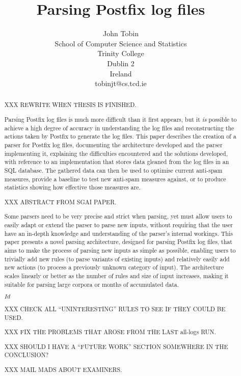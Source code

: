\documentclass[a4paper,12pt,draft]{report}
\begin{document}
\title{Parsing Postfix log files}
\author{John Tobin \\ School of Computer Science and Statistics \\
Trinity College \\ Dublin 2 \\ Ireland \\ tobinjt@cs.tcd.ie}
\maketitle

\begin{abstract}

    \setcounter{page}{2}

    XXX REWRITE WHEN THESIS IS FINISHED\@.

    Parsing Postfix log files is much more difficult than it first appears,
    but it \textit{is\/} possible to achieve a high degree of accuracy in
    understanding the log files and reconstructing the actions taken by
    Postfix to generate the log files.  This paper describes the creation
    of a parser for Postfix log files, documenting the architecture
    developed and the parser implementing it, explaining the difficulties
    encountered and the solutions developed, with reference to an
    implementation that stores data gleaned from the log files in an SQL
    database.  The gathered data can then be used to optimise current
    anti-spam measures, provide a baseline to test new anti-spam measures
    against, or to produce statistics showing how effective those measures
    are.

    XXX ABSTRACT FROM SGAI PAPER\@.

    Some parsers need to be very precise and strict when parsing, yet must
    allow users to easily adapt or extend the parser to parse new inputs,
    without requiring that the user have an in-depth knowledge and
    understanding of the parser's internal workings.  This paper presents a
    novel parsing architecture, designed for parsing Postfix log files,
    that aims to make the process of parsing new inputs as simple as
    possible, enabling users to trivially add new rules (to parse variants
    of existing inputs) and relatively easily add new actions (to process a
    previously unknown category of input).  The architecture scales
    linearly or better as the number of rules and size of input increases,
    making it suitable for parsing large corpora or months of accumulated
    data.

    \SVN$Id$
    \begin{center}
        \SVNId{}
    \end{center}

    XXX CHECK ALL ``UNINTERESTING'' RULES TO SEE IF THEY COULD BE USED\@.

    XXX FIX THE PROBLEMS THAT AROSE FROM THE LAST all-logs RUN\@.

    XXX SHOULD I HAVE A ``FUTURE WORK'' SECTION SOMEWHERE IN THE
    CONCLUSION\@?

    XXX MAIL MADS ABOUT EXAMINERS\@.

\end{abstract}
\end{document}
